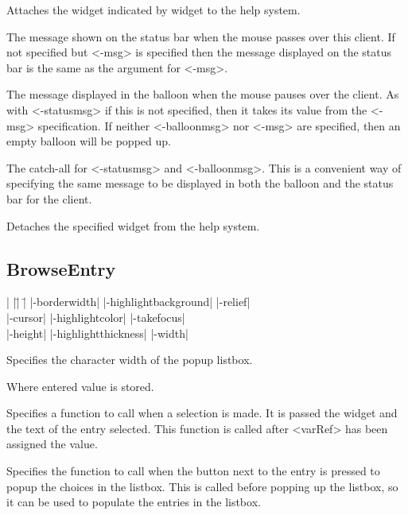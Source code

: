\vskip5pt

\begin{enum}{1cm}

Attaches the widget indicated by widget to the help system.

The message shown on the status bar when the mouse passes over this client. If not specified
but <-msg> is specified then the message displayed on the status bar is the same as the argument for <-msg>. 

The message displayed in the balloon when the mouse pauses over the client. As with <-statusmsg>
if this is not specified, then it takes its value from the <-msg> specification. If neither
<-balloonmsg> nor <-msg> are specified, then an empty balloon will be popped up.

The catch-all for <-statusmsg> and <-balloonmsg>. This is a convenient way of specifying
the same message to be displayed in both the balloon and the status bar for the client. 

Detaches the specified widget from the help system. 

\end{enum}

\subsection*{BrowseEntry}
\vspace{-4pt}

\begin{tabbing}
|                   |\=|                     |\= \kill
|-borderwidth|      \> |-highlightbackground| \> |-relief| \\
|-cursor|           \> |-highlightcolor|      \> |-takefocus| \\
|-height|	    \> |-highlightthickness|  \> |-width| \\
\end{tabbing}

\vskip5pt

\begin{enum}{1cm}

Specifies the character width of the popup listbox. 

Where entered value is stored. 

Specifies a function to call when a selection is made.
It is passed the widget and the text of the entry
selected. This function is called after <varRef> has been
assigned the value.

Specifies the function to call when the button next to the entry is pressed to popup the
choices in the listbox. This is called before popping up the listbox, so it can be used to
populate the entries in the listbox. 

\end{enum}

